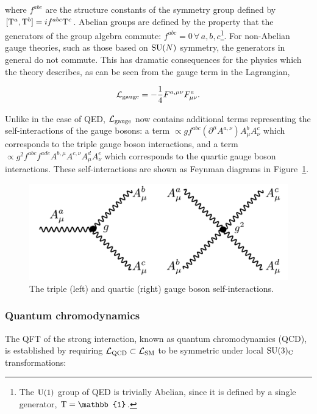 \noindent
where $f^{abc}$ are the structure constants of the symmetry group defined by $[{\rm{T}}^a,{\rm{T}}^b]=if^{abc}{\rm{T}}^c$. Abelian groups are defined by the property that the generators of the group algebra commute: $f^{abc}=0\, \forall\, a,b,c$\footnote{The ${\rm{U}}(1)$ group of QED is trivially Abelian, since it is defined by a single generator, ${\rm{T}}=\mathbb{1}$.}. For non-Abelian gauge theories, such as those based on ${\rm{SU}}(N)$ symmetry, the generators in general do not commute. This has dramatic consequences for the physics which the theory describes, as can be seen from the gauge term in the Lagrangian,

\begin{equation}
    \mathcal{L}_{\rm{gauge}} = -\frac{1}{4}F^{a,\mu\nu}F^a_{\mu\nu}.
\end{equation}

\noindent
Unlike in the case of QED, $\mathcal{L}_{\rm{gauge}}$ now contains additional terms representing the self-interactions of the gauge bosons: a term $\propto gf^{abc}(\partial^{\mu} A^{a,\nu})A^b_{\mu}A^c_\nu$ which corresponds to the triple gauge boson interactions, and a term $\propto g^2f^{abc}f^{ade}A^{b,\mu}A^{c,\nu}A^d_{\mu}A^e_\nu$ which corresponds to the quartic gauge boson interactions. These self-interactions are shown as Feynman diagrams in Figure~\ref{fig:gauge_selfinteraction}.

\begin{figure}[htb!]
  \centering
  \includegraphics[width=.6\linewidth]{Figures/theory/gauge_self_interaction.pdf}
  \caption[The gauge boson self-interactions]
  {
    The triple (left) and quartic (right) gauge boson self-interactions.
  }
  \label{fig:gauge_selfinteraction}
\end{figure}

\subsubsection{Quantum chromodynamics}
The QFT of the strong interaction, known as quantum chromodynamics (QCD), is established by requiring $\mathcal{L}_{\rm{QCD}} \subset \mathcal{L}_{\rm{SM}}$ to be symmetric under local ${\rm{SU}}(3)_{\rm{C}}$ transformations:

